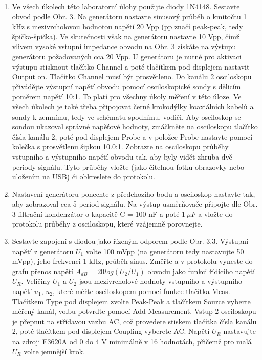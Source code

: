 \documentclass[a4paper, czech]{article}
\begin{document}
\begin{enumerate}
    \item Ve všech
úkolech této laboratorní úlohy použijte diody 1N4148. Sestavte obvod podle Obr. 3. Na generátoru nastavte sinusový průběh o kmitočtu
1 kHz s mezivrcholovou hodnotou napětí 20 Vpp (pp značí peak-peak,
tedy špička-špička). Ve skutečnosti však na generátoru nastavte 10 Vpp,
čímž vlivem vysoké vstupní impedance obvodu na Obr. 3 získáte na výstupu generátoru požadovaných cca 20 Vpp.
U generátoru je nutné pro aktivaci výstupu stisknout tlačítko Channel a poté
tlačítkem pod displejem nastavit Output on. Tlačítko Channel musí být
prosvětleno. Do kanálu 2 osciloskopu přivádějte výstupní napětí obvodu pomocí
osciloskopické sondy s dělicím poměrem napětí 10:1. To platí pro všechny
úkoly měření v této úloze. Ve všech úkolech je také třeba připojovat černé
krokodýlky koaxiálních kabelů a sondy k zemnímu, tedy ve schématu
spodnímu, vodiči. Aby osciloskop se sondou ukazoval správné napěťové hodnoty, zmáčkněte
na osciloskopu tlačítko čísla kanálu 2, poté pod displejem Probe a
v položce Probe nastavte pomocí kolečka s prosvětlenu šipkou 10.0:1.
Zobrazte na osciloskopu průběhy vstupního a výstupního napětí obvodu tak, aby
byly vidět zhruba dvě periody signálu. Tyto průběhy vložte (jako čitelnou fotku
obrazovky nebo uložením na USB) či obkreslete do protokolu.
    \item Nastavení
generátoru ponechte z předchozího bodu a osciloskop nastavte tak, aby
zobrazoval cca 5 period signálu. Na výstup usměrňovače připojte dle Obr. 3
filtrační kondenzátor o kapacitě C = 100 nF a
poté $1\ \mu F$ a vložte do protokolu průběhy z osciloskopu, které vzájemně porovnejte.
    \item Sestavte
zapojení s diodou jako řízeným odporem podle Obr. 3.3.
Výstupní napětí z generátoru $U_1$
volte 100 mVpp (na generátoru tedy nastavujte 50 mVpp), jeho
frekvenci 1 kHz, průběh sinus. Změřte a v protokolu vyneste do grafu přenos
napětí $A_{dB} = 20log(U_2/U_1)$
obvodu jako funkci řídicího napětí $U_R$.
Veličiny $U_1$ a $U_2$ jsou mezivrcholové hodnoty vstupního a
výstupního napětí $u_1$, $u_2$, které měřte osciloskopem pomocí funkce
tlačítka Meas. Tlačítkem Type pod displejem zvolte Peak-Peak a tlačítkem Source
vyberte měřený kanál, volbu potvrďte pomocí Add Measurement. Vstup 2 osciloskopu
je přepnut na střídavou vazbu AC, což provedete stiskem tlačítka čísla kanálu
2, poté tlačítkem pod displejem Coupling vyberete AC. Napětí $U_R$ nastavujte na zdroji E3620A od 0 do 4 V minimálně
v 16 hodnotách, přičemž pro malá $U_R$
volte jemnější krok.
\end{enumerate}
\end{document}
